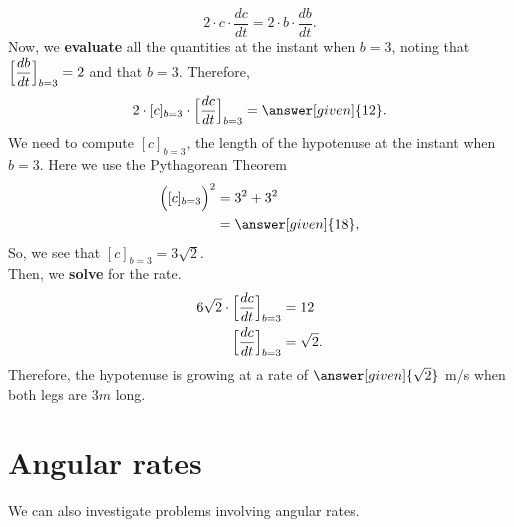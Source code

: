 \documentclass{ximera}
\begin{document}
\begin{example}
\begin{explanation}
       \[
    2\cdot c\cdot \dfrac{dc}{dt} = 2\cdot b\cdot \dfrac{db}{dt}.
    \]
    Now, we \textbf{evaluate} all the quantities at the instant when $b=3$, noting that
    $\Bigl[\dfrac{db}{dt}\Bigr]_{b=3} = 2$ and that $b = 3$. Therefore,
    \[
    2\cdot [c]_{b=3}\cdot \Bigl[\dfrac{dc}{dt}\Bigr]_{b=3} = \answer[given]{12}.
    \]
    We need to compute $[c]_{b=3}$, the length of the hypotenuse at the instant when $b=3$. Here we use
    the Pythagorean Theorem
    \begin{align*}
    \Bigl([c]_{b=3}\Bigr)^2 &= 3^2 + 3^2\\
    &=\answer[given]{18},
    \end{align*}
    So, we see that $[c]_{b=3} = 3\sqrt{2}$. \\
    Then, we \textbf{solve} for the rate.\\
    \begin{align*}
      6\sqrt{2}\cdot \Bigl[\dfrac{dc}{dt}\Bigr]_{b=3} &= 12 \\     
      \Bigl[\dfrac{dc}{dt}\Bigr]_{b=3} &= \sqrt{2}.
    \end{align*}
    Therefore, the hypotenuse  is growing at a rate of $\answer[given]{\sqrt{2}}$ m/s when both legs are $3m$ long.
  \end{explanation}
\end{example}


\section{Angular rates}


We can also investigate problems involving angular rates.
\end{document}
